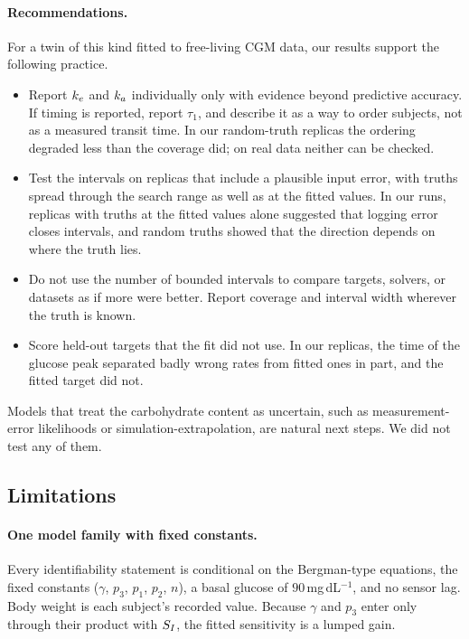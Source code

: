 \paragraph{Recommendations.}
For a twin of this kind fitted to free-living CGM data, our results support the following practice.
\begin{itemize}
\item Report $k_e$ and $k_a$ individually only with evidence beyond predictive accuracy. If timing is reported, report $\tau_1$, and describe it as a way to order subjects, not as a measured transit time. In our random-truth replicas the ordering degraded less than the coverage did; on real data neither can be checked.
\item Test the intervals on replicas that include a plausible input error, with truths spread through the search range as well as at the fitted values. In our runs, replicas with truths at the fitted values alone suggested that logging error closes intervals, and random truths showed that the direction depends on where the truth lies.
\item Do not use the number of bounded intervals to compare targets, solvers, or datasets as if more were better. Report coverage and interval width wherever the truth is known.
\item Score held-out targets that the fit did not use. In our replicas, the time of the glucose peak separated badly wrong rates from fitted ones in part, and the fitted target did not.
\end{itemize}
Models that treat the carbohydrate content as uncertain, such as measurement-error likelihoods or simulation-extrapolation, are natural next steps.
We did not test any of them.

\subsection{Limitations}
\label{sec:limits}

\paragraph{One model family with fixed constants.}
Every identifiability statement is conditional on the Bergman-type equations, the fixed constants ($\gamma$, $p_3$, $p_1$, $p_2$, $n$), a basal glucose of $90$\,mg\,dL$^{-1}$, and no sensor lag.
Body weight is each subject's recorded value.
Because $\gamma$ and $p_3$ enter only through their product with $S_I$, the fitted sensitivity is a lumped gain.

